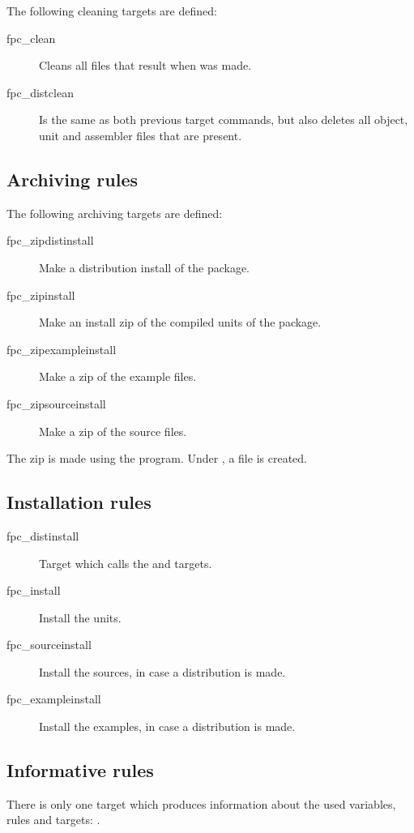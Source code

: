 The following cleaning targets are defined:
\begin{description}
\item[fpc\_clean] Cleans all files that result when  was made.
\item[fpc\_distclean] Is the same as both previous target commands, but also
deletes all object, unit and assembler files that are present.
\end{description}

\subsection{Archiving rules}

The following archiving targets are defined:
\begin{description}
\item[fpc\_zipdistinstall] Make a distribution install of the
package.
\item[fpc\_zipinstall] Make an install zip of the compiled units
of the  package.
\item[fpc\_zipexampleinstall] Make a zip of the example files.
\item[fpc\_zipsourceinstall] Make a zip of the source files.
\end{description}
The zip is made using the  program. Under \linux, a
 file is created.

\subsection{Installation rules}
\begin{description}
\item[fpc\_distinstall] Target which calls the  and
 targets. 
\item[fpc\_install] Install the units.
\item[fpc\_sourceinstall] Install the sources, in case a
distribution is made.
\item[fpc\_exampleinstall] Install the examples, in case
 a distribution is made.
\end{description}

\subsection{Informative rules}
There is only one target which produces information about the used
variables, rules and targets: .

